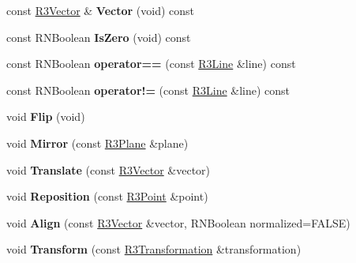 \begin{DoxyCompactItemize}
\item 
const \hyperlink{class_r3_vector}{R3\+Vector} \& {\bfseries Vector} (void) const \hypertarget{class_r3_line_a20b743a4d94e001acfc6622663c12165}{}\label{class_r3_line_a20b743a4d94e001acfc6622663c12165}

\item 
const R\+N\+Boolean {\bfseries Is\+Zero} (void) const \hypertarget{class_r3_line_a3b5c9a967f4adb299d5347280fb5b5b3}{}\label{class_r3_line_a3b5c9a967f4adb299d5347280fb5b5b3}

\item 
const R\+N\+Boolean {\bfseries operator==} (const \hyperlink{class_r3_line}{R3\+Line} \&line) const \hypertarget{class_r3_line_aef63e2697ea3b21f34499bd942694aa3}{}\label{class_r3_line_aef63e2697ea3b21f34499bd942694aa3}

\item 
const R\+N\+Boolean {\bfseries operator!=} (const \hyperlink{class_r3_line}{R3\+Line} \&line) const \hypertarget{class_r3_line_a2f21ac8a72d7138223ff10d1fd686a71}{}\label{class_r3_line_a2f21ac8a72d7138223ff10d1fd686a71}

\item 
void {\bfseries Flip} (void)\hypertarget{class_r3_line_a7afcac685ab61af341f88bc4894e89f5}{}\label{class_r3_line_a7afcac685ab61af341f88bc4894e89f5}

\item 
void {\bfseries Mirror} (const \hyperlink{class_r3_plane}{R3\+Plane} \&plane)\hypertarget{class_r3_line_a54683065aa06b7326365f26796d23f80}{}\label{class_r3_line_a54683065aa06b7326365f26796d23f80}

\item 
void {\bfseries Translate} (const \hyperlink{class_r3_vector}{R3\+Vector} \&vector)\hypertarget{class_r3_line_ae7e070736bfc965deb322e892b485c9f}{}\label{class_r3_line_ae7e070736bfc965deb322e892b485c9f}

\item 
void {\bfseries Reposition} (const \hyperlink{class_r3_point}{R3\+Point} \&point)\hypertarget{class_r3_line_a1e05001e880d5f6dbef08fd51df0caa8}{}\label{class_r3_line_a1e05001e880d5f6dbef08fd51df0caa8}

\item 
void {\bfseries Align} (const \hyperlink{class_r3_vector}{R3\+Vector} \&vector, R\+N\+Boolean normalized=F\+A\+L\+SE)\hypertarget{class_r3_line_aa77b45f257b933ca0f2aa9df6a2213b2}{}\label{class_r3_line_aa77b45f257b933ca0f2aa9df6a2213b2}

\item 
void {\bfseries Transform} (const \hyperlink{class_r3_transformation}{R3\+Transformation} \&transformation)\hypertarget{class_r3_line_a26164e52f532f2ec0fcc2ffe60b4df5f}{}\label{class_r3_line_a26164e52f532f2ec0fcc2ffe60b4df5f}


\end{DoxyCompactItemize}
